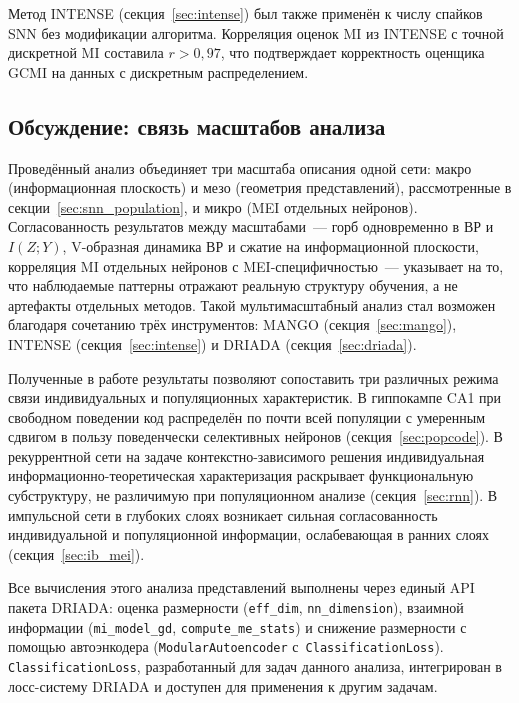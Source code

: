 Метод INTENSE (секция~\ref{sec:intense}) был также применён к числу спайков SNN без модификации алгоритма. Корреляция оценок MI из INTENSE с точной дискретной MI составила $r > 0{,}97$, что подтверждает корректность оценщика GCMI на данных с дискретным распределением.

\subsection{Обсуждение: связь масштабов анализа}\label{sec:ib_discussion}

Проведённый анализ объединяет три масштаба описания одной сети: макро (информационная плоскость) и мезо (геометрия представлений), рассмотренные в секции~\ref{sec:snn_population}, и микро (MEI отдельных нейронов). Согласованность результатов между масштабами~--- горб одновременно в ВР и $I(Z; Y)$, V-образная динамика ВР и сжатие на информационной плоскости, корреляция MI отдельных нейронов с MEI-специфичностью~--- указывает на то, что наблюдаемые паттерны отражают реальную структуру обучения, а не артефакты отдельных методов. Такой мультимасштабный анализ стал возможен благодаря сочетанию трёх инструментов: MANGO (секция~\ref{sec:mango}), INTENSE (секция~\ref{sec:intense}) и DRIADA (секция~\ref{sec:driada}).

Полученные в работе результаты позволяют сопоставить три различных режима связи индивидуальных и популяционных характеристик. В гиппокампе CA1 при свободном поведении код распределён по почти всей популяции с умеренным сдвигом в пользу поведенчески селективных нейронов (секция~\ref{sec:popcode}). В рекуррентной сети на задаче контекстно-зависимого решения индивидуальная информационно-теоретическая характеризация раскрывает функциональную субструктуру, не различимую при популяционном анализе (секция~\ref{sec:rnn}). В импульсной сети в глубоких слоях возникает сильная согласованность индивидуальной и популяционной информации, ослабевающая в ранних слоях (секция~\ref{sec:ib_mei}).

Все вычисления этого анализа представлений выполнены через единый API пакета DRIADA: оценка размерности (\texttt{eff\_dim}, \texttt{nn\_dimension}), взаимной информации (\texttt{mi\_model\_gd}, \texttt{compute\_me\_stats}) и снижение размерности с помощью автоэнкодера (\texttt{ModularAutoencoder} с~\texttt{ClassificationLoss}). \texttt{ClassificationLoss}, разработанный для задач данного анализа, интегрирован в лосс-систему DRIADA и доступен для применения к другим задачам.

